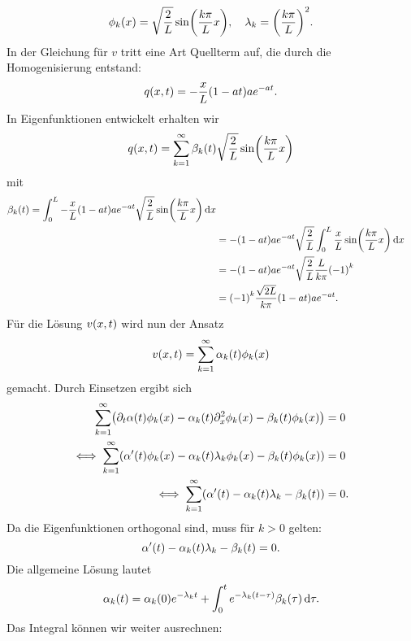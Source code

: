 \documentclass{exercise}
\begin{document}
    \[
        \phi_k\parentheses*{x} = \sqrt{\frac{2}{L}}\sin\parentheses*{\frac{k\pi}{L}x}, \quad \lambda_k = \parentheses*{\frac{k\pi}{L}}^2.
    \]
    In der Gleichung für \(v\) tritt eine Art Quellterm auf, die durch die Homogenisierung entstand:
    \[
        q\parentheses*{x, t} = -\frac{x}{L}\parentheses*{1 - at}ae^{-at}.
    \]
    In Eigenfunktionen entwickelt erhalten wir
    \[
        q\parentheses*{x, t} = \sum_{k = 1}^\infty \beta_k\parentheses*{t}\sqrt{\frac{2}{L}}\sin\parentheses*{\frac{k\pi}{L}x}
    \]
    mit
    \begin{align*}
        \beta_k\parentheses*{t} = \int_0^L -\frac{x}{L}\parentheses*{1 - at}ae^{-at}\sqrt{\frac{2}{L}}\sin\parentheses*{\frac{k\pi}{L}x}\d x\\
        &= -\parentheses*{1 - at}ae^{-at}\sqrt{\frac{2}{L}}\int_0^L \frac{x}{L}\sin\parentheses*{\frac{k\pi}{L}x}\d x\\
        &= -\parentheses*{1 - at}ae^{-at}\sqrt{\frac{2}{L}}\frac{L}{k\pi}\parentheses*{-1}^k\\
        &= \parentheses*{-1}^k \frac{\sqrt{2L}}{k\pi}\parentheses*{1 - at}ae^{-at}.
    \end{align*}
    Für die Lösung \(v\parentheses*{x, t}\) wird nun der Ansatz
    \[
        v\parentheses*{x, t} = \sum_{k = 1}^\infty \alpha_k\parentheses*{t}\phi_k\parentheses*{x}
    \]
    gemacht.
    Durch Einsetzen ergibt sich
    \begin{align*}
        \sum_{k = 1}^\infty \parentheses*{\partial_t \alpha\parentheses*{t}\phi_k\parentheses*{x} - \alpha_k\parentheses*{t}\partial_x^2 \phi_k\parentheses*{x} - \beta_k\parentheses*{t}\phi_k\parentheses*{x}} &= 0\\
        \iff \sum_{k = 1}^\infty \parentheses*{\alpha'\parentheses*{t}\phi_k\parentheses*{x} - \alpha_k\parentheses*{t}\lambda_k \phi_k\parentheses*{x} - \beta_k\parentheses*{t}\phi_k\parentheses*{x}} &= 0\\
        \iff \sum_{k = 1}^\infty \parentheses*{\alpha'\parentheses*{t} - \alpha_k\parentheses*{t}\lambda_k - \beta_k\parentheses*{t}} &= 0.
    \end{align*}
    Da die Eigenfunktionen orthogonal sind, muss für \(k > 0\) gelten:
    \[
        \alpha'\parentheses*{t} - \alpha_k\parentheses*{t}\lambda_k - \beta_k\parentheses*{t} = 0.
    \]
    Die allgemeine Lösung lautet
    \[
        \alpha_k\parentheses*{t} = \alpha_k\parentheses*{0}e^{-\lambda_k t} + \int_0^t e^{-\lambda_k\parentheses*{t - \tau}}\beta_k\parentheses*{\tau}\d\tau.
    \]
    Das Integral können wir weiter ausrechnen:
\end{document}
